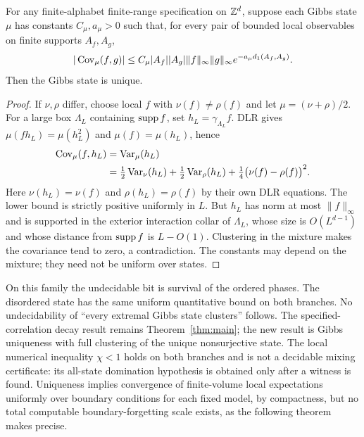 \begin{proposition}\label{prop:clustering-unique}
For any finite-alphabet finite-range specification on $\mathbb Z^d$, suppose each Gibbs state $\mu$ has constants $C_\mu,a_\mu>0$ such that, for every pair of bounded local observables on finite supports $A_f,A_g$,
\[
 |\operatorname{Cov}_\mu(f,g)|\le C_\mu |A_f||A_g|\|f\|_\infty\|g\|_\infty
 e^{-a_\mu d_1(A_f,A_g)}.
\]
Then the Gibbs state is unique.
\end{proposition}
\begin{proof}
If $\nu,\rho$ differ, choose local $f$ with $\nu(f)\ne\rho(f)$ and let $\mu=(\nu+\rho)/2$. For a large box $\Lambda_L$ containing $\operatorname{supp} f$, set $h_L=\gamma_{\Lambda_L}f$. DLR gives
$\mu(fh_L)=\mu(h_L^2)$ and $\mu(f)=\mu(h_L)$, hence
\begin{align*}
 \operatorname{Cov}_\mu(f,h_L)&=\operatorname{Var}_\mu(h_L)\\
 &=\tfrac12\operatorname{Var}_\nu(h_L)
   +\tfrac12\operatorname{Var}_\rho(h_L)
   +\tfrac14\bigl(\nu(f)-\rho(f)\bigr)^2.
\end{align*}
Here $\nu(h_L)=\nu(f)$ and $\rho(h_L)=\rho(f)$ by their own DLR equations. The lower bound is strictly positive uniformly in $L$. But $h_L$ has norm at most $\|f\|_\infty$ and is supported in the exterior interaction collar of $\Lambda_L$, whose size is $O(L^{d-1})$ and whose distance from $\operatorname{supp} f$ is $L-O(1)$. Clustering in the mixture makes the covariance tend to zero, a contradiction. The constants may depend on the mixture; they need not be uniform over states.
\end{proof}

\begin{remark}
On this family the undecidable bit is survival of the ordered phases. The disordered state has the same uniform quantitative bound on both branches. No undecidability of ``every extremal Gibbs state clusters'' follows. The specified-correlation decay result remains Theorem~\ref{thm:main}; the new result is Gibbs uniqueness with full clustering of the unique nonsurjective state. The local numerical inequality $\chi<1$ holds on both branches and is not a decidable mixing certificate: its all-state domination hypothesis is obtained only after a witness is found. Uniqueness implies convergence of finite-volume local expectations uniformly over boundary conditions for each fixed model, by compactness, but no total computable boundary-forgetting scale exists, as the following theorem makes precise.
\end{remark}


